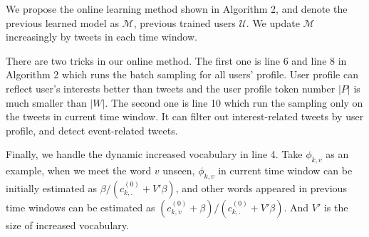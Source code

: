\documentclass[runningheads,a4paper]{llncs}
\begin{document}
We propose the online learning method shown in Algorithm 2, and denote the previous learned model as \(\mathcal{M}\), previous trained users \(\mathcal{U}\).
We update \(\mathcal{M}\) increasingly by tweets in each time window.

There are two tricks in our online method.
The first one is line 6 and line 8 in Algorithm 2 which runs the batch sampling for all users' profile.
User profile can reflect user's interests better than tweets and the user profile token number \(|P|\) is much smaller than \(|W|\).
The second one is line 10 which run the sampling only on the tweets in current time window.
It can filter out interest-related tweets by user profile, and detect event-related tweets.

Finally, we handle the dynamic increased vocabulary in line 4.
Take \(\phi_{k,v}\) as an example, when we meet the word \(v\) unseen, \(\phi_{k,v}\) in current time window can be initially estimated as \(\beta / (c^{(0)}_{k,.}+V'\beta)\), and other words appeared in previous time windows can be estimated as \((c^{(0)}_{k,v}+\beta) / (c^{(0)}_{k,.}+V'\beta)\).
And \(V'\) is the size of increased vocabulary.

\end{document}
